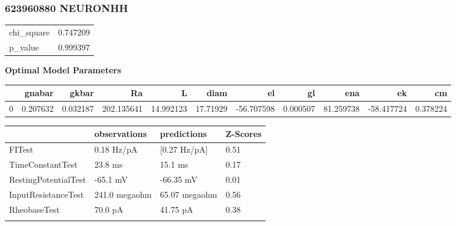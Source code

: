 \subsubsection{623960880 NEURONHH}
\begin{tabular}{lr}
\toprule
chi\_square &  0.747209 \\
p\_value    &  0.999397 \\
\bottomrule
\end{tabular}
\textbf{Optimal Model Parameters}
\begin{tabular}{lrrrrrrrrrr}
\toprule
{} &    gnabar &     gkbar &          Ra &          L &      diam &         el &        gl &        ena &         ek &        cm \\
\midrule
0 &  0.207632 &  0.032187 &  202.135641 &  14.992123 &  17.71929 & -56.707598 &  0.000507 &  81.259738 & -58.417724 &  0.378224 \\
\bottomrule
\end{tabular}
\begin{tabular}{llll}
\toprule
{} &   observations &    predictions & Z-Scores \\
\midrule
FITest               &     0.18 Hz/pA &   [0.27 Hz/pA] &     0.51 \\
TimeConstantTest     &        23.8 ms &        15.1 ms &     0.17 \\
RestingPotentialTest &       -65.1 mV &      -66.35 mV &     0.01 \\
InputResistanceTest  &  241.0 megaohm &  65.07 megaohm &     0.56 \\
RheobaseTest         &        70.0 pA &       41.75 pA &     0.38 \\
\bottomrule
\label{tab:conductance_623960880}

\end{tabular}


